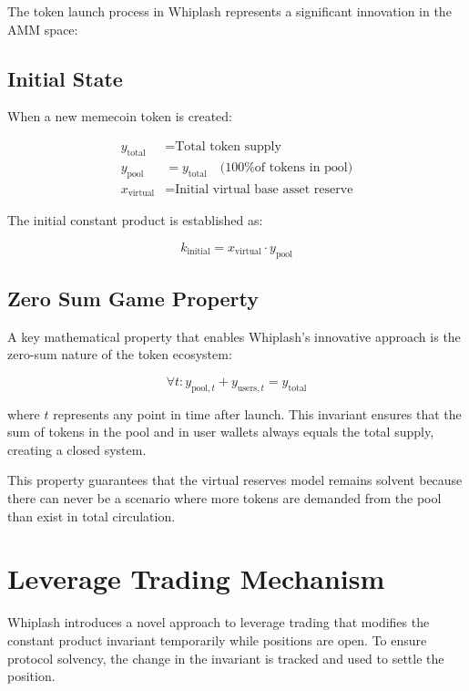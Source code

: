 \documentclass[11pt]{article}
\begin{document}
The token launch process in Whiplash represents a significant innovation in the AMM space:

\subsection{Initial State}
When a new memecoin token is created:

\begin{equation}
\begin{aligned}
y_{\text{total}} &= \text{Total token supply} \\
y_{\text{pool}} &= y_{\text{total}} \quad \text{(100\% of tokens in pool)} \\
x_{\text{virtual}} &= \text{Initial virtual base asset reserve}
\end{aligned}
\end{equation}

The initial constant product is established as:

\begin{equation}
k_{\text{initial}} = x_{\text{virtual}} \cdot y_{\text{pool}}
\end{equation}

\subsection{Zero Sum Game Property}

A key mathematical property that enables Whiplash's innovative approach is the zero-sum nature of the token ecosystem:

\begin{equation}
\forall t: y_{\text{pool},t} + y_{\text{users},t} = y_{\text{total}}
\end{equation}

where $t$ represents any point in time after launch. This invariant ensures that the sum of tokens in the pool and in user wallets always equals the total supply, creating a closed system.

This property guarantees that the virtual reserves model remains solvent because there can never be a scenario where more tokens are demanded from the pool than exist in total circulation.

\section{Leverage Trading Mechanism}

Whiplash introduces a novel approach to leverage trading that modifies the constant product invariant temporarily while positions are open. To ensure protocol solvency, the change in the invariant is tracked and used to settle the position.
\end{document}

